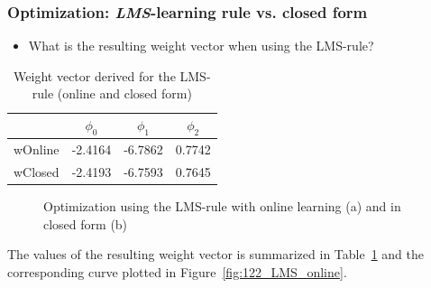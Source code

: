 \documentclass[a4]{article}
\begin{document}
\subsubsection{Optimization: \emph{LMS}-learning rule vs. closed form}
%
%
\begin{itemize}
	\item What is the resulting weight vector when using the LMS-rule?
\end{itemize}
\begin{table} [tbp!]
	\caption{Weight vector derived for the LMS-rule (online and closed form)}
	\centering
	\label{table:wLMS}
	\begin{tabular}{l c c c}
		\toprule
		& $\phi_0$ & $\phi_1$ & $\phi_2$ \\ 
		\midrule
		wOnline & -2.4164  & -6.7862  &  0.7742 \\
		wClosed &  -2.4193  & -6.7593  &  0.7645  \\
		\bottomrule
	\end{tabular}
\end{table}
\begin{figure}[!h]
	\centering
	\caption{Optimization using the LMS-rule with online learning (a) and in closed form (b)}
	\label{fig:122_LMS}
\end{figure}
The values of the resulting weight vector is summarized in Table~\ref{table:wLMS} and the corresponding curve plotted in Figure~\ref{fig:122_LMS_online}.
\end{document}
